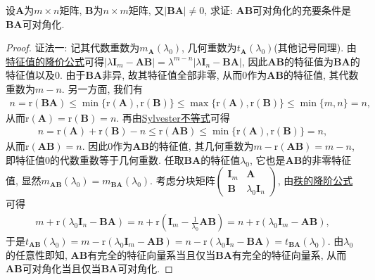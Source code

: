 \documentclass[../../main.tex]{subfiles}
\begin{document}
\begin{proposition}\label{proposition:矩阵乘积可对角化且可逆则交换后也可对角化}
设\(\boldsymbol{A}\)为\(m\times n\)矩阵, \(\boldsymbol{B}\)为\(n\times m\)矩阵, 又\(|\boldsymbol{B}\boldsymbol{A}|\neq 0\), 求证: \(\boldsymbol{A}\boldsymbol{B}\)可对角化的充要条件是\(\boldsymbol{B}\boldsymbol{A}\)可对角化.
\end{proposition}
\begin{proof}
{\color{blue}证法一:}
记其代数重数为\(m_{\boldsymbol{A}}(\lambda_0)\), 几何重数为\(t_{\boldsymbol{A}}(\lambda_0)\)(其他记号同理). 
由\hyperref[theorem:特征值的降价公式]{特征值的降价公式}可得\(|\lambda\boldsymbol{I}_m - \boldsymbol{A}\boldsymbol{B}| = \lambda^{m - n}|\lambda\boldsymbol{I}_n - \boldsymbol{B}\boldsymbol{A}|\), 因此\(\boldsymbol{A}\boldsymbol{B}\)的特征值为\(\boldsymbol{B}\boldsymbol{A}\)的特征值以及\(0\). 由于\(\boldsymbol{B}\boldsymbol{A}\)非异, 故其特征值全部非零, 从而\(0\)作为\(\boldsymbol{A}\boldsymbol{B}\)的特征值, 其代数重数为\(m - n\). 另一方面, 我们有
\begin{align*}
n = \mathrm{r}(\boldsymbol{B}\boldsymbol{A})\leq \min\{\mathrm{r}(\boldsymbol{A}),\mathrm{r}(\boldsymbol{B})\}\leq \max\{\mathrm{r}(\boldsymbol{A}),\mathrm{r}(\boldsymbol{B})\}\leq \min\{m,n\} = n,
\end{align*}
从而\(\mathrm{r}(\boldsymbol{A}) = \mathrm{r}(\boldsymbol{B}) = n\). 再由\hyperref[proposition:Sylvester不等式]{Sylvester不等式}可得
\begin{align*}
n = \mathrm{r}(\boldsymbol{A})+\mathrm{r}(\boldsymbol{B}) - n\leq \mathrm{r}(\boldsymbol{A}\boldsymbol{B})\leq \min\{\mathrm{r}(\boldsymbol{A}),\mathrm{r}(\boldsymbol{B})\} = n,
\end{align*}
从而\(\mathrm{r}(\boldsymbol{A}\boldsymbol{B}) = n\). 因此\(0\)作为\(\boldsymbol{A}\boldsymbol{B}\)的特征值, 其几何重数为\(m - \mathrm{r}(\boldsymbol{A}\boldsymbol{B}) = m - n\), 即特征值\(0\)的代数重数等于几何重数. 任取\(\boldsymbol{B}\boldsymbol{A}\)的特征值\(\lambda_0\), 它也是\(\boldsymbol{A}\boldsymbol{B}\)的非零特征值, 显然\(m_{\boldsymbol{A}\boldsymbol{B}}(\lambda_0) = m_{\boldsymbol{B}\boldsymbol{A}}(\lambda_0)\). 考虑分块矩阵\(\begin{pmatrix}
\boldsymbol{I}_m&\boldsymbol{A}\\
\boldsymbol{B}&\lambda_0\boldsymbol{I}_n
\end{pmatrix}\), 由\hyperref[proposition:秩的降阶公式]{秩的降阶公式}可得
\begin{align*}
m + \mathrm{r}(\lambda_0\boldsymbol{I}_n - \boldsymbol{B}\boldsymbol{A}) = n + \mathrm{r}(\boldsymbol{I}_m - \frac{1}{\lambda_0}\boldsymbol{A}\boldsymbol{B}) = n + \mathrm{r}(\lambda_0\boldsymbol{I}_m - \boldsymbol{A}\boldsymbol{B}),
\end{align*}
于是\(t_{\boldsymbol{A}\boldsymbol{B}}(\lambda_0) = m - \mathrm{r}(\lambda_0\boldsymbol{I}_m - \boldsymbol{A}\boldsymbol{B}) = n - \mathrm{r}(\lambda_0\boldsymbol{I}_n - \boldsymbol{B}\boldsymbol{A}) = t_{\boldsymbol{B}\boldsymbol{A}}(\lambda_0)\). 由\(\lambda_0\)的任意性即知, \(\boldsymbol{A}\boldsymbol{B}\)有完全的特征向量系当且仅当\(\boldsymbol{B}\boldsymbol{A}\)有完全的特征向量系, 从而\(\boldsymbol{A}\boldsymbol{B}\)可对角化当且仅当\(\boldsymbol{B}\boldsymbol{A}\)可对角化.


\end{proof}
\end{document}
